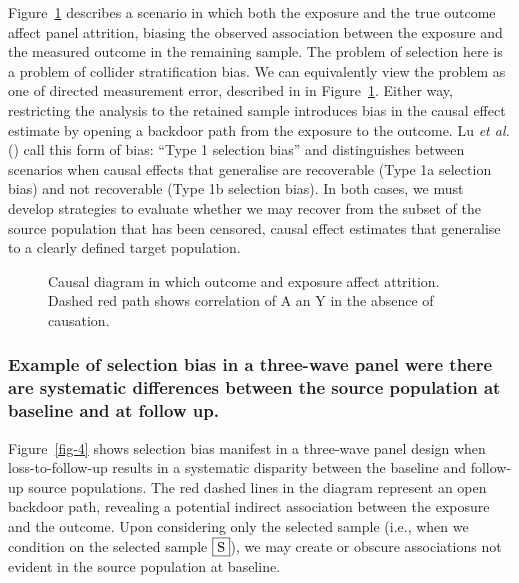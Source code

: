 \documentclass[
  singlecolumn,
  9pt]{article}
\begin{document}
Figure~\ref{fig-3} describes a scenario in which both the exposure and
the true outcome affect panel attrition, biasing the observed
association between the exposure and the measured outcome in the
remaining sample. The problem of selection here is a problem of collider
stratification bias. We can equivalently view the problem as one of
directed measurement error, described in in Figure~\ref{fig-3}. Either
way, restricting the analysis to the retained sample introduces bias in
the causal effect estimate by opening a backdoor path from the exposure
to the outcome. Lu \emph{et al.} () call this
form of bias: ``Type 1 selection bias'' and distinguishes between
scenarios when causal effects that generalise are recoverable (Type 1a
selection bias) and not recoverable (Type 1b selection bias). In both
cases, we must develop strategies to evaluate whether we may recover
from the subset of the source population that has been censored, causal
effect estimates that generalise to a clearly defined target population.

\begin{figure}


\caption{\label{fig-3}Causal diagram in which outcome and exposure
affect attrition. Dashed red path shows correlation of A an Y in the
absence of causation.}

\end{figure}%

\subsubsection{Example of selection bias in a three-wave panel were
there are systematic differences between the source population at
baseline and at follow
up.}\label{example-of-selection-bias-in-a-three-wave-panel-were-there-are-systematic-differences-between-the-source-population-at-baseline-and-at-follow-up.}

Figure~\ref{fig-4} shows selection bias manifest in a three-wave panel
design when loss-to-follow-up results in a systematic disparity between
the baseline and follow-up source populations. The red dashed lines in
the diagram represent an open backdoor path, revealing a potential
indirect association between the exposure and the outcome. Upon
considering only the selected sample (i.e., when we condition on the
selected sample \(\framebox{S}\)), we may create or obscure associations
not evident in the source population at baseline.
\end{document}
